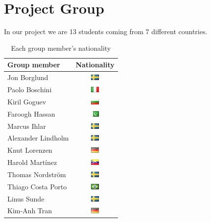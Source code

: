 \section{Project Group}

In our project we are 13 students coming from 7 different countries.


\begin{table}
\centering
\begin{tabular}{|l|c|}
\hline
Group member & Nationality \\ \hline\hline
Jon Borglund & \includegraphics{graphics/se} \\
Paolo Boschini & \includegraphics{graphics/it} \\
Kiril Goguev & \includegraphics{graphics/bg} \\
Faroogh Hassan & \includegraphics{graphics/pk} \\
Marcus Ihlar & \includegraphics{graphics/se} \\
Alexander Lindholm & \includegraphics{graphics/se} \\
Knut Lorenzen & \includegraphics{graphics/de} \\
Harold Mart\'{i}nez & \includegraphics{graphics/ve} \\
Thomas Nordstr\"om & \includegraphics{graphics/se} \\
Thiago Costa Porto & \includegraphics{graphics/br} \\
Linus Sunde & \includegraphics{graphics/se} \\
Kim-Anh Tran & \includegraphics{graphics/de} \\
\hline
\end{tabular}
\caption{Each group member's nationality}\label{}
\end{table}


